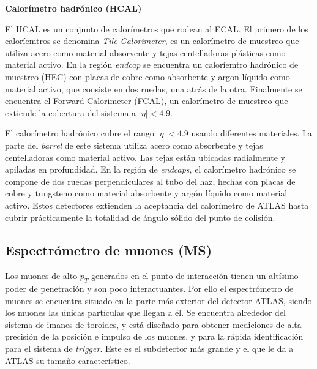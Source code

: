 {\bf Calorímetro hadrónico (HCAL)}

El HCAL es un conjunto de calorímetros que rodean al ECAL. El primero de los caloríemtros se denomina \textit{Tile Calorimeter}, es un calorímetro de muestreo que utiliza acero como material absorvente y tejas centelladoras plásticas como material activo. En la región \textit{endcap} se encuentra un caloríemtro hadrónico de muestreo (HEC) con placas de cobre como absorbente y argon líquido como material activo, que consiste en dos ruedas, una atrás de la otra. Finalmente se encuentra el Forward Calorimeter (FCAL), un calorímetro de muestreo que extiende la cobertura del sistema a $|\eta|<4.9$.

El calorímetro hadrónico cubre el rango $|\eta|< 4.9$ usando diferentes materiales. La parte del \textit{barrel} de este sistema utiliza acero como absorbente y tejas centelladoras como material activo. Las tejas están ubicadas radialmente y apiladas en profundidad. En la región de \textit{endcaps}, el calorímetro hadrónico se compone de dos ruedas perpendiculares al tubo del haz, hechas con placas de cobre y tungsteno como material absorbente y argón líquido como material activo. Estos detectores extienden la aceptancia del calorímetro de ATLAS hasta cubrir prácticamente la totalidad de ángulo sólido del punto de colisión.

\subsection{Espectrómetro de muones (MS)}

Los muones de alto $p_{T}$ generados en el punto de interacción tienen un altísimo poder de penetración y son poco interactuantes. Por ello el espectrómetro de muones se encuentra situado en la parte más exterior del detector ATLAS, siendo los muones las únicas partículas que llegan a él. Se encuentra alrededor del sistema de imanes de toroides, y está diseñado para obtener mediciones de alta precisión de la posición e impulso de los muones, y para la rápida identificación para el sistema de \textit{trigger}. Este es el subdetector más grande y el que le da a ATLAS su tamaño característico. 

